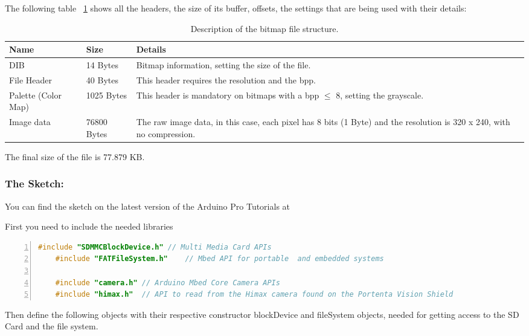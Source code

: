 The following table ~\ref{tab:bitmap} shows all the headers, the size of its buffer, offsets, the settings that are being used with their details: \cite{portentaCameraToBitmap:2024}

\begin{table}[h]
	\centering
	\begin{tabular}{|l|l|p{8cm}|}
		\hline
		\textbf{Name} & \textbf{Size} & \textbf{Details} \\ \hline
		DIB & 14 Bytes & Bitmap information, setting the size of the file. \\ \hline
		File Header & 40 Bytes & This header requires the resolution and the bpp. \\ \hline
		Palette (Color Map) & 1025 Bytes & This header is mandatory on bitmaps with a bpp $\leq$ 8, setting the grayscale. \\ \hline
		Image data & 76800 Bytes & The raw image data, in this case, each pixel has 8 bits (1 Byte) and the resolution is 320 x 240, with no compression. \\ \hline
	\end{tabular}
	\caption{Description of the bitmap file structure.}
	\label{tab:bitmap}
\end{table}

The final size of the file is 77.879 KB.

\subsubsection{The Sketch:} You can find the sketch on the latest version of the Arduino Pro Tutorials at  

First you need to include the needed libraries \cite{portentaCameraToBitmap:2024}

\begin{lstlisting}[language=C++, frame=single, numbers=left, basicstyle=\ttfamily\small]
	#include "SDMMCBlockDevice.h" // Multi Media Card APIs
	#include "FATFileSystem.h"    // Mbed API for portable  and embedded systems
	
	#include "camera.h" // Arduino Mbed Core Camera APIs
	#include "himax.h"  // API to read from the Himax camera found on the Portenta Vision Shield
\end{lstlisting}

Then define the following objects with their respective constructor blockDevice and fileSystem objects, needed for getting access to the SD Card and the file system. \cite{portentaCameraToBitmap:2024}


